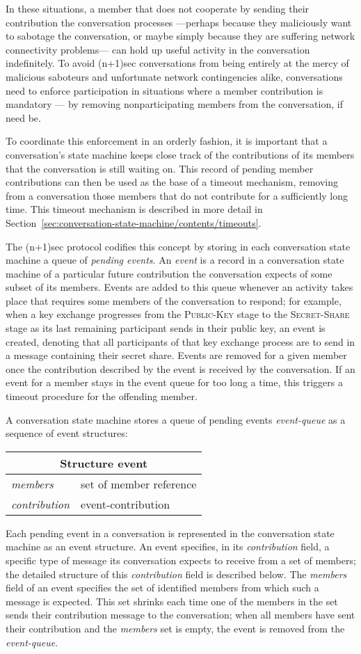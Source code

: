 \documentclass{article}
\def\smfield#1{\textsl{#1}}
\def\type#1{\textsf{#1}}
\newenvironment{struct}[1]{
\newcommand{\structfield}[2]{
\smfield{##1} & \type{##2} \\
\hline
}
\par
\vspace{-\medskipamount}
\hspace{2em minus 2em}\begin{tabular}{|l|l|}
\hline
\multicolumn{2}{|c|}{Structure \type{#1}} \\
\hline
\hline
}{
\end{tabular}
\vspace{-\medskipamount}
\par
}
\begin{document}
In these situations, a member that does not cooperate by sending their contribution the conversation processes ---perhaps because they maliciously want to sabotage the conversation, or maybe simply because they are suffering network connectivity problems--- can hold up useful activity in the conversation indefinitely.
To avoid (n+1)sec conversations from being entirely at the mercy of malicious saboteurs and unfortunate network contingencies alike, conversations need to enforce participation in situations where a member contribution is mandatory --- by removing nonparticipating members from the conversation, if need be.

To coordinate this enforcement in an orderly fashion, it is important that a conversation's state machine keeps close track of the contributions of its members that the conversation is still waiting on.
This record of pending member contributions can then be used as the base of a timeout mechanism, removing from a conversation those members that do not contribute for a sufficiently long time.
This timeout mechanism is described in more detail in Section~\ref{sec:conversation-state-machine/contents/timeouts}.

The (n+1)sec protocol codifies this concept by storing in each conversation state machine a queue of \emph{pending events}.
An \emph{event} is a record in a conversation state machine of a particular future contribution the conversation expects of some subset of its members.
Events are added to this queue whenever an activity takes place that requires some members of the conversation to respond; for example, when a key exchange progresses from the \textsc{Public-Key} stage to the \textsc{Secret-Share} stage as its last remaining participant sends in their public key, an event is created, denoting that all participants of that key exchange process are to send in a message containing their secret share.
Events are removed for a given member once the contribution described by the event is received by the conversation.
If an event for a member stays in the event queue for too long a time, this triggers a timeout procedure for the offending member.


A conversation state machine stores a queue of pending events \smfield{event-queue} as a sequence of \type{event} structures:
\begin{struct}{event}
\structfield{members}{set of member reference}
\structfield{contribution}{event-contribution}
\end{struct}
Each pending event in a conversation is represented in the conversation state machine as an \type{event} structure.
An event specifies, in its \smfield{contribution} field, a specific type of message its conversation expects to receive from a set of members; the detailed structure of this \smfield{contribution} field is described below.
The \smfield{members} field of an event specifies the set of identified members from which such a message is expected.
This set shrinks each time one of the members in the set sends their contribution message to the conversation; when all members have sent their contribution and the \smfield{members} set is empty, the event is removed from the \smfield{event-queue}.
\end{document}
